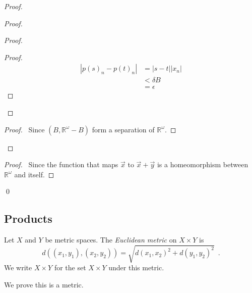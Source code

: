 \begin{proof}
\pf
{}
\begin{proof}
	\begin{proof}
		\begin{proof}
			\pf
			\begin{align*}
				|p(s)_n - p(t)_n| & = |s-t||x_n| \\
				& < \delta B \\
				& = \epsilon
			\end{align*}
		\end{proof}
	\end{proof}
	\begin{proof}
		\pf\ Since $(B, \mathbb{R}^\omega - B)$ form a separation of $\mathbb{R}^\omega$.
	\end{proof}
\end{proof}
\begin{proof}
	\pf\ Since the function that maps $\vec{x}$ to $\vec{x} + \vec{y}$ is a homeomorphism between $\mathbb{R}^\omega$ and itself.
\end{proof}
\qed
\end{proof}

\subsection{Products}

\begin{df}
Let $X$ and $Y$ be metric spaces. The \emph{Euclidean metric} on $X \times Y$ is
\[ d((x_1, y_1), (x_2, y_2)) = \sqrt{d(x_1,x_2)^2 + d(y_1,y_2)^2} \enspace .\]
We write $X \times Y$ for the set $X \times Y$ under this metric.

We prove this is a metric.
\end{df}


